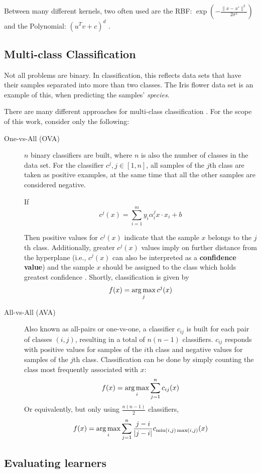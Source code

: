 Between many different kernels, two often used are the RBF: $\exp(-\frac{\|x -x'\|^2}{2\sigma^2})$ and the Polynomial: $(u^T v + c)^{d}$ \cite{svmkernels}.

\subsection{Multi-class Classification}

Not all problems are binary. In classification, this reflects data sets that have their samples separated into more than two classes. The Iris flower data set is an example of this, when predicting the samples' {\em species}.

There are many different approaches for multi-class classification \cite{rif2008}. For the scope of this work, consider only the following:

\begin{description}
	\item[One-vs-All (OVA)] $n$ binary classifiers are built, where $n$ is also the number of classes in the data set. For the classifier $c^j, j \in [1, n]$, all samples of the $j$th class are taken as positive examples, at the same time that all the other samples are considered negative.

	If
	$$c^j(x) = \sum_{i=1}^{m} y_i \alpha_i^j x \cdot x_i + b$$

	Then positive values for $c^j(x)$ indicate that the sample $x$ belongs to the $j$th class. Additionally, greater $c^j(x)$ values imply on further distance from the hyperplane (i.e., $c^j(x)$ can also be interpreted as a \textbf{confidence value}) and the sample $x$ should be assigned to the class which holds greatest confidence \cite{ovacj}. Shortly, classification is given by
	$$ f(x) = \operatorname*{arg\,max}_j{c^j(x)} $$
	\item[All-vs-All (AVA)] Also known as all-pairs or one-vs-one, a classifier $c_{ij}$ is built for each pair of classes $(i, j)$, resulting in a total of $n(n-1)$ classifiers. $c_{ij}$ responds with positive values for samples of the $i$th class and negative values for samples of the $j$th class. Classification can be done by simply counting the class most frequently associated with $x$:
	$$ f(x) = \operatorname*{arg\,max}_i{\sum_{j=1}^{n} c_{ij}(x)} $$
	Or equivalently, but only using $\frac{n(n-1)}{2}$ classifiers,
	$$ f(x) = \operatorname*{arg\,max}_i{\sum_{j=1}^{n} \frac{j-i}{|j-i|} c_{\min(i, j) \max(i, j)}(x)} $$
\end{description}

\subsection{Evaluating learners}


